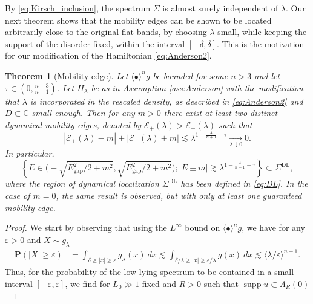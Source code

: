 \documentclass[reqno,12pt,letterpaper]{amsart}
\newtheorem{theo}{Theorem}
\numberwithin{equation}{section}
\DeclareMathOperator{\supp}{supp}
\begin{document}
By \eqref{eq:Kirsch_inclusion}, the spectrum $\Sigma $ is almost surely independent of $\lambda.$ Our next theorem shows that the mobility edges can be shown to be located arbitrarily close to the original flat bands, by choosing $\lambda$ small, while keeping the support of the disorder fixed, within the interval $[-\delta,\delta]$. This is the motivation for our modification of the Hamiltonian \eqref{eq:Anderson2}. 
{\begin{theo}[Mobility edge]
\label{theo:localization}
Let $\langle \bullet \rangle^{n} g$ be bounded for some $n>3$ and let $\tau \in (0,\tfrac{n-3}{n+1})$. Let $H_{\lambda}$ be as in Assumption \ref{ass:Anderson} with the modification that $\lambda$ is incorporated in the rescaled density, as described in \eqref{eq:Anderson2}  and $D \subset \mathbb C$ small enough. Then for any $m>0$ there exist at least two distinct dynamical mobility edges, denoted by $\mathscr E_{+}(\lambda) >\mathscr E_{-}(\lambda)$ such that
\[ \left\lvert \mathscr E_{+}(\lambda) - m \right\rvert+\left\lvert \mathscr E_{-}(\lambda) + m \right\rvert \lesssim \lambda^{1-\frac{4}{n+1} -\tau} \xrightarrow[ \lambda \downarrow 0]{} 0.\] 
In particular, 
\[ \left\{ E \in \Big(-\sqrt{E_{\operatorname{gap}}^2/2+m^2},\sqrt{E_{\operatorname{gap}}^2/2+m^2}\Big); \vert E \pm m \vert \gtrsim \lambda^{1-\frac{4}{n+1} -\tau} \right\} \subset \Sigma^{\operatorname{DL}},\]
where the region of dynamical localization $\Sigma^{\operatorname{DL}}$ has been defined in \eqref{eq:DL}.
In the case of $m=0$, the same result is observed, but with only at least one guaranteed mobility edge. 
\end{theo}
\begin{proof}
We start by observing that using the $L^{\infty}$ bound on $\langle \bullet \rangle^{n} g$, we have for any $\varepsilon>0$ and $X \sim g_{\lambda}$ 
\begin{equation}
\begin{split}
\label{eq:flambda} \mathbf P(\vert X \vert \ge \varepsilon) &=\int_{\delta \ge \vert x \vert \ge \varepsilon} g_{\lambda}(x) \ dx \lesssim \int_{\delta/\lambda \ge \vert x \vert \ge \varepsilon/\lambda} g(x) \ dx\lesssim  \langle \lambda/\varepsilon \rangle^{n-1}.
\end{split} 
\end{equation}
Thus, for the probability of the low-lying spectrum to be contained in a small interval $[-\varepsilon,\varepsilon]$, we find for $L_0 \gg 1$ fixed and $R>0$ such that $\supp u \subset \Lambda_R(0)$


\end{proof}}
\end{document}
